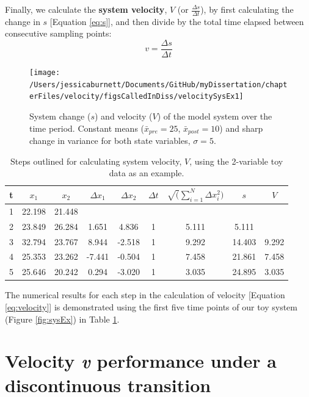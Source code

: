 \documentclass[12pt,twoside,openany]{reedthesis}
\begin{document}
Finally, we calculate the \textbf{system velocity}, \(V\) (or \(\frac{\Delta s}{\Delta t}\)), by first calculating the change in \(s\) {[}Equation \eqref{eq:s}{]}, and then divide by the total time elapsed between consecutive sampling points:
\begin{equation}
 v = \frac {\Delta s}{\Delta t} 
\label{eq:velocity}
\end{equation}
\begin{figure}
\texttt{[image: /Users/jessicaburnett/Documents/GitHub/myDissertation/chapterFiles/velocity/figsCalledInDiss/velocitySysEx1]} \caption{System change ($s$) and velocity ($V$) of the model system over the time period. Constant means ($\bar{x}_{pre}=25$, $\bar{x}_{post}=10$) and sharp change in variance for both state variables, $\sigma =5$.}\label{fig:velocSysEx1}
\end{figure}
\begin{table}[t]

\caption{\label{tab:distTab}Steps outlined for calculating system velocity, $V$, using the 2-variable toy data as an example.}
\centering
\begin{tabular}{ccccccccc}
\toprule
t & $x_1$ & $x_2$ & $\Delta x_1$ & $\Delta x_2$ & $\Delta t$ & $\sqrt(\sum_{i=1}^N \Delta x_i^2) $ & $s$ & $V$\\
\midrule
1 & 22.198 & 21.448 &  &  &  &  &  & \\
2 & 23.849 & 26.284 & 1.651 & 4.836 & 1 & 5.111 & 5.111 & \\
3 & 32.794 & 23.767 & 8.944 & -2.518 & 1 & 9.292 & 14.403 & 9.292\\
4 & 25.353 & 23.262 & -7.441 & -0.504 & 1 & 7.458 & 21.861 & 7.458\\
5 & 25.646 & 20.242 & 0.294 & -3.020 & 1 & 3.035 & 24.895 & 3.035\\
\bottomrule
\end{tabular}
\end{table}
The numerical results for each step in the calculation of velocity {[}Equation \eqref{eq:velocity}{]} is demonstrated using the first five time points of our toy system (Figure \ref{fig:sysEx}) in Table \ref{tab:distTab}.

\hypertarget{velocity-v-performance-under-a-discontinuous-transition}{%
\section{\texorpdfstring{Velocity \emph{v} performance under a discontinuous transition}{Velocity v performance under a discontinuous transition}}\label{velocity-v-performance-under-a-discontinuous-transition}}
\end{document}
